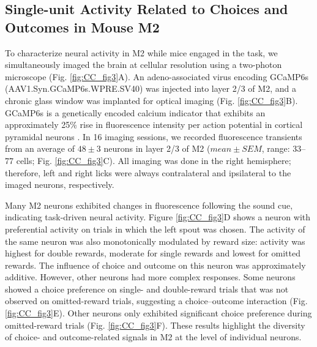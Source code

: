 \subsection[Single-unit Activity Related to Choices and Outcomes]
{Single-unit Activity Related to Choices and Outcomes in Mouse M2}
To characterize neural activity in M2 while mice engaged in the task, we simultaneously imaged the brain at cellular resolution using a two-photon microscope \citep{denk1990two} (Fig. \ref{fig:CC_fig3}A). An adeno-associated virus encoding GCaMP6s (AAV1.Syn.GCaMP6s.WPRE.SV40) was injected into layer 2/3 of M2, and a chronic glass window was implanted for optical imaging (Fig. \ref{fig:CC_fig3}B). GCaMP6s is a genetically encoded calcium indicator that exhibits an approximately 25\% rise in fluorescence intensity per action potential in cortical pyramidal neurons \citep{chen2013ultrasensitive}. In 16 imaging sessions, we recorded fluorescence transients from an average of $48 \pm 3$ neurons in layer 2/3 of M2 ($mean \pm SEM$, range: 33–77 cells; Fig. \ref{fig:CC_fig3}C). All imaging was done in the right hemisphere; therefore, left and right licks were always contralateral and ipsilateral to the imaged neurons, respectively.



Many M2 neurons exhibited changes in fluorescence following the sound cue, indicating task-driven neural activity. Figure \ref{fig:CC_fig3}D shows a neuron with preferential activity on trials in which the left spout was chosen. The activity of the same neuron was also monotonically modulated by reward size: activity was highest for double rewards, moderate for single rewards and lowest for omitted rewards. The influence of choice and outcome on this neuron was approximately additive. However, other neurons had more complex responses. Some neurons showed a choice preference on single- and double-reward trials that was not observed on omitted-reward trials, suggesting a choice–outcome interaction (Fig. \ref{fig:CC_fig3}E). Other neurons only exhibited significant choice preference during omitted-reward trials (Fig. \ref{fig:CC_fig3}F). These results highlight the diversity of choice- and outcome-related signals in M2 at the level of individual neurons.

